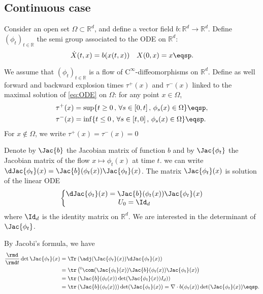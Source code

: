 \subsection{Continuous case}
Consider an open set $\Omega \subset \mathbb{R}^d$, and define a vector field $b:\mathbb{R}^d \to \mathbb{R}^d$. 
Define $(\phi_t)_{t \in \mathbb{R}}$ the semi group associated to the ODE on $\mathbb{R}^d$:
\begin{equation}
\label{eq:ODE}
    \dot{X}(t, {x})=b(x(t, x)) \quad X(0, x)=x \eqsp .
\end{equation}

We assume that $(\phi_t)_{t \in \mathbb{R}}$ is a flow of $\mathrm{C}^\infty$-diffeomorphisms on $\mathbb{R}^{d}$. 
Define as well forward and backward explosion times $\tau^{+}(x)$ and $\tau^{-}(x)$ linked to the maximal solution of \eqref{eq:ODE} on $\Omega$: for any point $x \in \Omega$, 
\begin{align}
    &\tau^+(x) = \sup\{t\geq0\,,\,  \forall  s \in [0,t]\,,\, \phi_s(x) \in \Omega\} \eqsp,\\
    &\tau^-(x) = \inf\{t\leq0\,,\,  \forall s \in [t,0]\,,\, \phi_s(x) \in \Omega\}\eqsp.
\end{align} 
For $x \notin \Omega$, we write $\tau^+(x) =\tau^-(x)=0$



Denote by $\Jac{b}$ the Jacobian matrix of function $b$ and by $\Jac{\phi_t}$ the Jacobian matrix of the flow $x \mapsto \phi_t (x)$ at time $t$.
we can write $\dJac{\phi_t}(x) =\Jac{b}(\phi_t(x)) \Jac{\phi_t}(x)$. 
The matrix $\Jac{\phi_t}(x)$ is solution of the linear ODE 
$$\left\{\begin{matrix}\dJac{\phi_t}(x) = \Jac{b}(\phi_t(x)) \Jac{\phi_t}(x)
\\ U_0 = \Id_d
\end{matrix}\right.$$ 
where $\Id_d$ is the identity matrix on $\mathbb{R}^{d}$.
We are interested in the determinant of $\Jac{\phi_t}$. 

By Jacobi's formula, we have 
\begin{align*}
    \frac{\rmd}{\rmd t} \det \Jac{\phi_t}(x) &= \Tr\left(\adj(\Jac{\phi_t}(x)) \dJac{\phi_t}(x)\right)\\
    &= \tr\left(^t\com(\Jac{\phi_t}(x))  \Jac{b}(\phi_t(x)) \Jac{\phi_t}(x)\right)\\
    &= \tr\left( \Jac{b}(\phi_t(x)) \det(\Jac{\phi_t}(x)) I_d\right))\\
    &= \tr\left( \Jac{b}(\phi_t(x))\right) \det(\Jac{\phi_t}(x)) = \nabla \cdot b(\phi_t(x)) \det(\Jac{\phi_t}(x)) \eqsp.
\end{align*}

